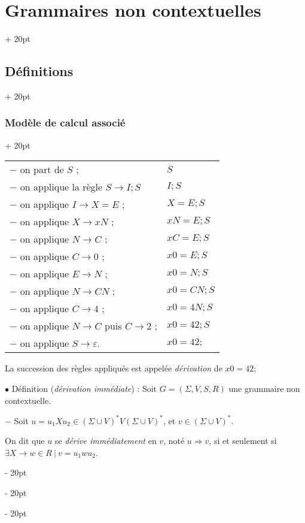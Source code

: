 \documentclass[a4paper, 12pt, twoside]{article}
\newcommand{\lr}[1]{\left( #1 \right)}
\newcommand{\ind}[1][20pt]{\advance\leftskip + #1}
\newcommand{\deind}[1][20pt]{\advance\leftskip - #1}
\newenvironment{indt}[2][20pt]{#2 \par \ind[#1]}{\par \deind} %
\begin{document}
\begin{indt}{\section{Grammaires non contextuelles}}
\begin{indt}{\subsection{Définitions}}
\begin{indt}{\subsubsection{Modèle de calcul associé}}
                \begin{tabular}{ll}
                    $-$ on part de $S$ ;
                    & $S$
                    \\
                    $-$ on applique la règle $S \rightarrow I ; S$
                    & $I ; S$
                    \\
                    $-$ on applique $I \rightarrow X = E$ ;
                    & $X = E ; S$
                    \\
                    $-$ on applique $X \rightarrow xN$ ;
                    & $xN = E ; S$
                    \\
                    $-$ on applique $N \rightarrow C$ ;
                    & $xC = E; S$
                    \\
                    $-$ on applique $C \rightarrow 0$ ;
                    & $x0 = E; S$
                    \\
                    $-$ on applique $E \rightarrow N$ ;
                    & $x0 = N; S$
                    \\
                    $-$ on applique $N \rightarrow CN$ ;
                    & $x0 = CN; S$
                    \\
                    $-$ on applique $C \rightarrow 4$ ;
                    & $x0 = 4N; S$
                    \\
                    $-$ on applique $N \rightarrow C$ puis $C \rightarrow 2$ ;
                    & $x0 = 42; S$
                    \\
                    $-$ on applique $S \rightarrow \varepsilon$.
                    & $x0 = 42;$
                \end{tabular}

                \vspace{6pt}
                
                La succession des règles appliqués est appelée \emph{dérivation} de $x0 = 42;$

                \vspace{12pt}
                
                $\bullet$ Définition (\textit{dérivation immédiate}) : Soit $G = \lr{\Sigma, V, S, R}$ une grammaire non contextuelle.

                $-$ Soit $u = u_1 X u_2 \in \lr{\Sigma \cup V}^* V \lr{\Sigma \cup V}^*$, et $v \in \lr{\Sigma \cup V}^*$.

                On dit que $u$ se \emph{dérive immédiatement} en $v$, noté $u \Rightarrow v$, si et seulement si $\exists X \rightarrow w \in R\ |\ v = u_1 w u_2$.


\end{indt}
\end{indt}
\end{indt}
\end{document}
